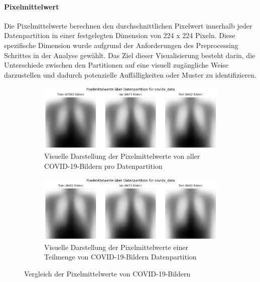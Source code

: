 \paragraph{Pixelmittelwert} \label{chap:COVID19-pixelmittelwert}
Die Pixelmittelwerte berechnen den durchschnittlichen Pixelwert innerhalb jeder Datenpartition in einer festgelegten Dimension von 224 x 224 Pixeln. Diese spezifische Dimension wurde aufgrund der Anforderungen des Preprocessing Schrittes in der Analyse gewählt. Das Ziel dieser Visualisierung besteht darin, die Unterschiede zwischen den Partitionen auf eine visuell zugängliche Weise darzustellen und dadurch potenzielle Auffälligkeiten oder Muster zu identifizieren.

\begin{figure}[H]
    \centering
    \begin{subfigure}[b]{0.49\linewidth}
        \centering
        \includegraphics[width=\linewidth]{01-images/03-data/covid-pixelmittelwerte.png}
        \caption{Visuelle Darstellung der Pixelmittelwerte von aller COVID-19-Bildern pro Datenpartition}
        \label{fig:covid-pixelmittelwert-full}
    \end{subfigure}
    \hfill
    \begin{subfigure}[b]{0.49\linewidth}
        \centering
        \includegraphics[width=\linewidth]{01-images/03-data/covidx-pixelmittelwert-subsample-train.png}
        \caption{Visuelle Darstellung der Pixelmittelwerte einer Teilmenge von COVID-19-Bildern Datenpartition}
        \label{fig:covid-pixelmittelwert-subsample}
    \end{subfigure}
    \caption{Vergleich der Pixelmittelwerte von COVID-19-Bildern}
    \label{fig:covid-pixelmittelwert-comparison}
\end{figure}

